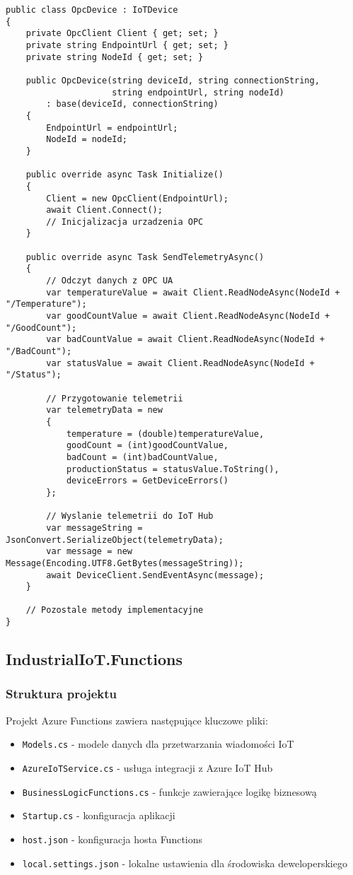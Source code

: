 \documentclass{article}
\begin{document}
\begin{lstlisting}[style=csharp, caption=OpcDevice.cs (fragment)]
public class OpcDevice : IoTDevice
{
    private OpcClient Client { get; set; }
    private string EndpointUrl { get; set; }
    private string NodeId { get; set; }

    public OpcDevice(string deviceId, string connectionString, 
                     string endpointUrl, string nodeId)
        : base(deviceId, connectionString)
    {
        EndpointUrl = endpointUrl;
        NodeId = nodeId;
    }

    public override async Task Initialize()
    {
        Client = new OpcClient(EndpointUrl);
        await Client.Connect();
        // Inicjalizacja urzadzenia OPC
    }

    public override async Task SendTelemetryAsync()
    {
        // Odczyt danych z OPC UA
        var temperatureValue = await Client.ReadNodeAsync(NodeId + "/Temperature");
        var goodCountValue = await Client.ReadNodeAsync(NodeId + "/GoodCount");
        var badCountValue = await Client.ReadNodeAsync(NodeId + "/BadCount");
        var statusValue = await Client.ReadNodeAsync(NodeId + "/Status");
        
        // Przygotowanie telemetrii
        var telemetryData = new
        {
            temperature = (double)temperatureValue,
            goodCount = (int)goodCountValue,
            badCount = (int)badCountValue,
            productionStatus = statusValue.ToString(),
            deviceErrors = GetDeviceErrors()
        };
        
        // Wyslanie telemetrii do IoT Hub
        var messageString = JsonConvert.SerializeObject(telemetryData);
        var message = new Message(Encoding.UTF8.GetBytes(messageString));
        await DeviceClient.SendEventAsync(message);
    }
    
    // Pozostale metody implementacyjne
}
\end{lstlisting}

\subsection{IndustrialIoT.Functions}
\subsubsection{Struktura projektu}
Projekt Azure Functions zawiera następujące kluczowe pliki:
\begin{itemize}
    \item \texttt{Models.cs} - modele danych dla przetwarzania wiadomości IoT
    \item \texttt{AzureIoTService.cs} - usługa integracji z Azure IoT Hub
    \item \texttt{BusinessLogicFunctions.cs} - funkcje zawierające logikę biznesową
    \item \texttt{Startup.cs} - konfiguracja aplikacji
    \item \texttt{host.json} - konfiguracja hosta Functions
    \item \texttt{local.settings.json} - lokalne ustawienia dla środowiska deweloperskiego
\end{itemize}
\end{document}
